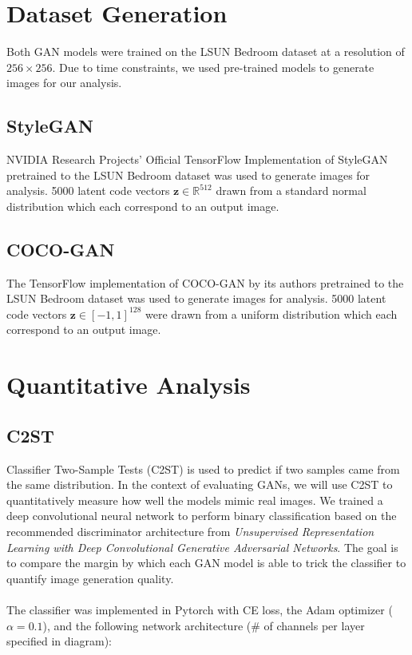 \documentclass[10pt]{article}
\begin{document}
\begin{multicols*}{2}
        \section{Dataset Generation}
        \label{sec:dataset}
        Both GAN models were trained on the LSUN Bedroom dataset\cite{lsunBedroom} at a resolution of $256 \times 256$.
        Due to time constraints, we used pre-trained models to generate images for our analysis.

        \label{sec:datasetGeneration}
        \subsection{StyleGAN}
        \label{subsec:styleganGeneration}
        NVIDIA Research Projects' Official TensorFlow Implementation of StyleGAN pretrained to the LSUN Bedroom dataset\cite{styleGANCode} was used to generate images for analysis.
        5000 latent code vectors $\mathbf{z} \in \mathbb{R}^{512}$ drawn from a standard normal distribution which each correspond to an output image.

        \subsection{COCO-GAN}
        \label{subsec:cocoganGeneration}
        The TensorFlow implementation of COCO-GAN by its authors pretrained to the LSUN Bedroom dataset\cite{cocogan} was used to generate images for analysis.
        5000 latent code vectors $\mathbf{z} \in [-1, 1]^{128}$ were drawn from a uniform distribution which each correspond to an output image.

        \section{Quantitative Analysis}
        \label{sec:quantitative}
        \subsection{C2ST}
        \label{subsec:c2st}
        Classifier Two-Sample Tests (C2ST) is used to predict if two samples came from the same distribution\cite{c2st}.
        In the context of evaluating GANs, we will use C2ST to quantitatively measure how well the models mimic real images.
        We trained a deep convolutional neural network to perform binary classification based on the recommended discriminator architecture from \textit{Unsupervised Representation Learning
with Deep Convolutional Generative Adversarial Networks}\cite{dcgan}.
        The goal is to compare the margin by which each GAN model is able to trick the classifier to quantify image generation quality.
        \\\\
        The classifier was implemented in Pytorch with CE loss, the Adam optimizer ($\alpha=0.1$), and the following network architecture (\# of channels per layer specified in diagram):


\end{multicols*}
\end{document}
